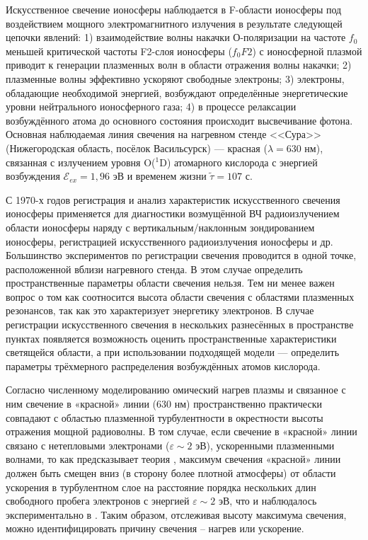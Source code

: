 \documentclass[12pt,a4paper]{article}
\begin{document}
Искусственное свечение ионосферы наблюдается в F-области ионосферы под воздействием мощного электромагнитного излучения в результате следующей цепочки явлений: 1) взаимодействие волны накачки О-поляризации на частоте $f_0$ меньшей критической частоты F2-слоя ионосферы ($f_{0}F2$) с ионосферной плазмой приводит к генерации плазменных волн в области отражения волны накачки; 2) плазменные волны эффективно ускоряют свободные электроны; 3) электроны, обладающие необходимой энергией, возбуждают определённые энергетические уровни нейтрального ионосферного газа; 4) в процессе релаксации возбуждённого атома до основного состояния происходит высвечивание фотона. Основная наблюдаемая линия свечения на нагревном стенде <<Сура>> (Нижегородская область, посёлок Васильсурск) --- красная ($\lambda = 630$ нм), связанная с излучением уровня O($^1$D) атомарного кислорода с энергией возбуждения $\mathcal{E}_{ex} = 1,96$ эВ и временем жизни $\widetilde{\tau} = 107$ с.




С 1970-х годов регистрация и анализ характеристик искусственного свечения ионосферы применяется для диагностики возмущённой ВЧ радиоизлучением области ионосферы \cite{BIONDI1970} наряду с вертикальным/наклонным зондированием ионосферы, регистрацией искусственного радиоизлучения ионосферы и др. 
Большинство экспериментов по регистрации свечения проводится в одной точке, расположенной вблизи нагревного стенда. В этом случае определить пространственные параметры области свечения нельзя. Тем ни менее важен вопрос о том как соотносится высота области свечения с областями плазменных резонансов, так как это характеризует энергетику электронов.
В случае регистрации искусственного свечения в нескольких разнесённых в пространстве пунктах появляется возможность оценить пространственные характеристики светящейся области, а при использовании подходящей модели --- определить параметры трёхмерного распределения возбуждённых атомов кислорода. 

Согласно численному моделированию \cite{Mantas1996} омический нагрев плазмы и связанное с ним свечение в «красной» линии (630 нм) пространственно практически совпадают с областью плазменной турбулентности в окрестности высоты отражения мощной радиоволны. В том случае, если свечение в «красной» линии связано с нетепловыми электронами ($\varepsilon \sim 2$ эВ), ускоренными плазменными волнами, то как предсказывает теория \cite{Vaskov1983,Gurevich1985}, максимум свечения «красной» линии должен быть смещен вниз (в сторону более плотной атмосферы) от области ускорения в турбулентном слое на расстояние порядка нескольких длин свободного пробега электронов с энергией $\varepsilon \sim 2$ эВ, что и наблюдалось экспериментально в \cite{HASLETT1974,Gustavsson2001,Gustavsson2008}. Таким образом, отслеживая высоту максимума свечения, можно идентифицировать причину свечения – нагрев или ускорение.
\end{document}
